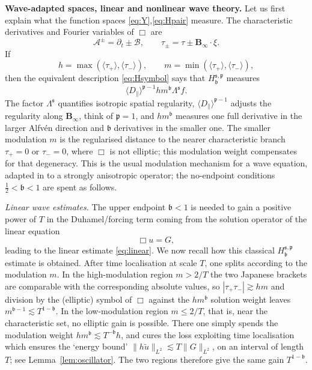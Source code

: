 \documentclass[11pt,reqno]{amsart}
\theoremstyle{plain}
\theoremstyle{definition}
\theoremstyle{remark}
\numberwithin{equation}{section}
\newcommand{\breg}{\mathfrak b}
\newcommand{\sreg}{\mathfrak s}
\newcommand{\preg}{\mathfrak p}
\newcommand{\Binf}{\mathbf B_\infty}
\begin{document}
\textbf{Wave-adapted spaces, linear and nonlinear wave theory.} Let us first explain what the function spaces \eqref{eq:Y},\eqref{eq:Hpair} measure.  The characteristic
derivatives and Fourier variables of $\Box$ are
\[
 \mathcal A^\pm=\partial_t\pm\mathcal B,
 \qquad \tau_\pm=\tau\pm\Binf\cdot\xi.
\]
If
\[
 h=\max(\langle\tau_+\rangle,\langle\tau_-\rangle),
 \qquad
 m=\min(\langle\tau_+\rangle,\langle\tau_-\rangle),
\]
then the equivalent description \eqref{eq:Hsymbol} says that
$H_{\breg}^{\sreg,\preg}$ measures
\[
 \langle D_\parallel\rangle^{\preg-1}
 h m^{\breg}\Lambda^{\sreg}f.
\]
The factor $\Lambda^{\sreg}$ quantifies isotropic spatial regularity,
$\langle D_\parallel\rangle^{\preg-1}$ adjusts the regularity along
$\Binf$, think of $\preg=1$, and $h m^{\breg}$ measures one full derivative in
the larger Alfv\'en direction and $\breg$ derivatives in the smaller
one.  The smaller modulation $m$ is the regularised distance to the nearer
characteristic branch $\tau_+=0$ or $\tau_-=0$, where $\Box$ is not elliptic; this modulation weight compensates for that degeneracy. This is the usual modulation mechanism for a wave equation, adapted in \cite{Zhang2024} to a
strongly anisotropic operator; the no-endpoint conditions $\frac12<\breg <1$ are spent as follows. 

\textit{Linear wave estimates.} The upper endpoint $\breg <1$ is needed to gain a positive power of $T$ in the
Duhamel/forcing term coming from the solution operator of the linear equation
\[
    \Box u=G,
\]
leading to the linear estimate \eqref{eq:linear}.  We now recall how this classical $H^{\sreg,\preg}_{\breg}$ estimate is obtained. After time
localisation at scale $T$, one splits according to the modulation $m$.  In the
high-modulation region $m>2/T$ the two Japanese brackets are comparable with
the corresponding absolute values, so $|\tau_+\tau_-|\gtrsim hm$ and
division by the (elliptic) symbol of $\Box$ against the $hm^{\breg}$ solution weight
leaves $m^{\breg-1}\lesssim T^{1-\breg}$.  In the low-modulation region
$m\le2/T$, that is, near the characteristic set, no elliptic gain is
possible. There one simply spends the modulation weight $hm^{\breg}\lesssim T^{-\breg}h$, and cures the loss exploiting time localisation which ensures the `energy bound' $\|h\widetilde u\|_{L^2}\lesssim T\|G\|_{L^2}$, on an interval of length $T$; see Lemma~\ref{lem:oscillator}.  The two regions therefore give the same gain $T^{1-\breg}$.
\end{document}
